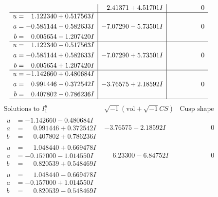 \documentclass[1p]{elsarticle_modified}
\theoremstyle{definition}
\newcommand{\I}{\sqrt{-1}}
\begin{document}
$$\begin{array}{c|c|c}
 & \phantom{-}2.41371 + 4.51701 I & \phantom{-0.000000 } 0 \\ \hline\begin{aligned}
u &= \phantom{-}1.122340 + 0.517563 I \\
a &= -0.585144 - 0.582633 I \\
b &= \phantom{-}0.005654 - 1.207420 I\end{aligned}
 & -7.07290 - 5.73501 I & \phantom{-0.000000 } 0 \\ \hline\begin{aligned}
u &= \phantom{-}1.122340 - 0.517563 I \\
a &= -0.585144 + 0.582633 I \\
b &= \phantom{-}0.005654 + 1.207420 I\end{aligned}
 & -7.07290 + 5.73501 I & \phantom{-0.000000 } 0 \\ \hline\begin{aligned}
u &= -1.142660 + 0.480684 I \\
a &= \phantom{-}0.991446 - 0.372542 I \\
b &= \phantom{-}0.407802 - 0.786236 I\end{aligned}
 & -3.76575 + 2.18592 I & \phantom{-0.000000 } 0\\
 \hline 
 \end{array}$$\newpage$$\begin{array}{c|c|c}  
\text{Solutions to }I^u_{1}& \I (\text{vol} + \sqrt{-1}CS) & \text{Cusp shape}\\
 \hline 
\begin{aligned}
u &= -1.142660 - 0.480684 I \\
a &= \phantom{-}0.991446 + 0.372542 I \\
b &= \phantom{-}0.407802 + 0.786236 I\end{aligned}
 & -3.76575 - 2.18592 I & \phantom{-0.000000 } 0 \\ \hline\begin{aligned}
u &= \phantom{-}1.048440 + 0.669478 I \\
a &= -0.157000 - 1.014550 I \\
b &= \phantom{-}0.820539 + 0.548469 I\end{aligned}
 & \phantom{-}6.23300 - 6.84752 I & \phantom{-0.000000 } 0 \\ \hline\begin{aligned}
u &= \phantom{-}1.048440 - 0.669478 I \\
a &= -0.157000 + 1.014550 I \\
b &= \phantom{-}0.820539 - 0.548469 I\end{aligned}

\end{array}$$
\end{document}
